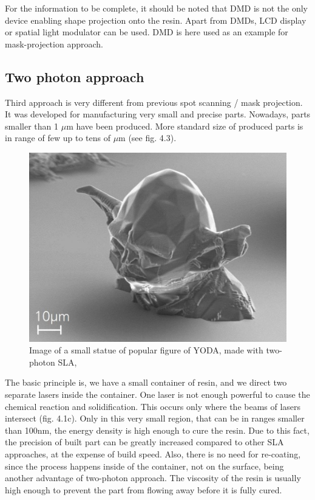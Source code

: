 \documentclass[a4paper, 11pt, reqno]{report}
\begin{document}
	For the information to be complete, it should be noted that DMD is not the only device enabling shape projection onto the resin. Apart from DMDs, LCD display or spatial light modulator can be used. DMD is here used as an example for mask-projection approach.
%
\subsection{Two photon approach}
Third approach is very different from previous spot scanning / mask projection. It was developed for manufacturing very small and precise parts. Nowadays, parts smaller than 1 $\mu$m have been produced. More standard size of produced parts is in range of few up to tens of $\mu$m (see fig. 4.3).
%
\begin{figure}[b!]
\centering
\includegraphics[scale=0.5]{yoda}
\caption{Image of a small statue of popular figure of YODA, made with two-photon SLA, \cite{yoda}}
\end{figure}
%
	The basic principle is, we have a small container of resin, and we direct two separate lasers inside the container. One laser is not enough powerful to cause the chemical reaction and solidification. This occurs only where the beams of lasers intersect (fig. 4.1c). Only in this very small region, that can be in ranges smaller than 100nm, the energy density is high enough to cure the resin. Due to this fact, the precision of built part can be greatly increased compared to other SLA approaches, at the expense of build speed. Also, there is no need for re-coating, since the process happens inside of the container, not on the surface, being another advantage of two-photon approach. The viscosity of the resin is usually high enough to prevent the part from flowing away before it is fully cured.
%
\end{document}
